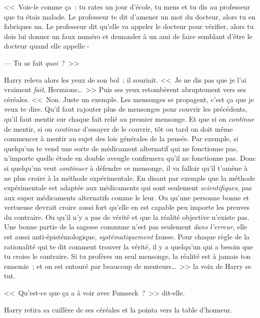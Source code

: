 <<~Vois-le comme ça~: tu rates un jour d'école, tu mens et tu dis au professeur que tu étais malade. Le professeur te dit d'amener un mot du docteur, alors tu en fabriques un. Le professeur dit qu'elle va appeler le docteur pour vérifier, alors tu dois lui donner un faux numéro et demander à un ami de faire semblant d'être le docteur quand elle appelle -

--- Tu as fait \emph{quoi}~?~>>

Harry releva alors les yeux de son bol~; il souriait. <<~Je ne dis pas que je l'ai vraiment \emph{fait}, Hermione…~>> Puis ses yeux retombèrent abruptement vers ses céréales. <<~Non. Juste un exemple. Les mensonges se propagent, c'est ça que je veux te dire. Qu'il faut rajouter plus de mensonges pour couvrir les précédents, qu'il faut mentir sur chaque fait relié au premier mensonge. Et que si on \emph{continue} de mentir, si on \emph{continue} d'essayer de le couvrir, tôt ou tard on doit même commencer à mentir au sujet des lois générales de la pensée. Par exemple, si quelqu'un te vend une sorte de médicament alternatif qui ne fonctionne pas, n'importe quelle étude en double aveugle confirmera qu'il ne fonctionne pas. Donc si quelqu'un veut \emph{continuer} à défendre ce mensonge, il va falloir qu'il t'amène à ne plus croire à la méthode expérimentale. En disant par exemple que la méthode expérimentale est adaptée aux médicaments qui sont seulement \emph{scientifiques}, pas aux super médicaments alternatifs comme le leur. Ou qu'une personne bonne et vertueuse devrait croire aussi fort qu'elle en est capable peu importe les preuves du contraire. Ou qu'il n'y a pas de vérité et que la réalité objective n'existe pas. Une bonne partie de la sagesse commune n'est pas seulement \emph{dans l'erreur}, elle est aussi anti-épistémologique, \emph{systématiquement} fausse. Pour chaque règle de la rationalité qui te dit comment trouver la vérité, il y a quelqu'un qui a besoin que tu croies le contraire. Si tu profères un seul mensonge, la réalité est à jamais ton ennemie~; et on est entouré par beaucoup de menteurs…~>> la voix de Harry se tut.

<<~Qu'est-ce que ça a à voir avec Fumseck~?~>> dit-elle.

Harry retira sa cuillère de ses céréales et la pointa vers la table d'honneur.

